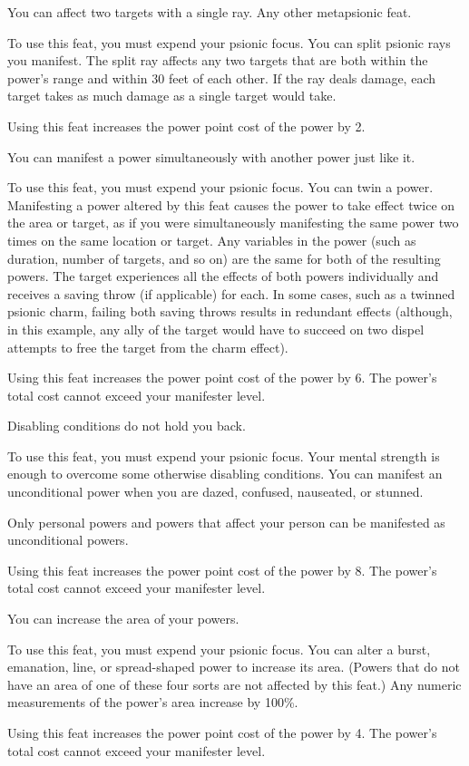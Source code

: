 {You can affect two targets with a single ray.}
{Any other metapsionic feat.}
{To use this feat, you must expend your psionic focus. You can split psionic rays you manifest. The split ray affects any two targets that are both within the power’s range and within 30 feet of each other. If the ray deals damage, each target takes as much damage as a single target would take.

Using this feat increases the power point cost of the power by 2.}{}{}

{You can manifest a power simultaneously with another power just like it.}
{}
{To use this feat, you must expend your psionic focus. You can twin a power. Manifesting a power altered by this feat causes the power to take effect twice on the area or target, as if you were simultaneously manifesting the same power two times on the same location or target. Any variables in the power (such as duration, number of targets, and so on) are the same for both of the resulting powers. The target experiences all the effects of both powers individually and receives a saving throw (if applicable) for each. In some cases, such as a twinned psionic charm, failing both saving throws results in redundant effects (although, in this example, any ally of the target would have to succeed on two dispel attempts to free the target from the charm effect).

Using this feat increases the power point cost of the power by 6. The power’s total cost cannot exceed your manifester level.}{}{}

{Disabling conditions do not hold you back.}
{}
{To use this feat, you must expend your psionic focus. Your mental strength is enough to overcome some otherwise disabling conditions. You can manifest an unconditional power when you are dazed, confused, nauseated, or stunned.

Only personal powers and powers that affect your person can be manifested as unconditional powers.

Using this feat increases the power point cost of the power by 8. The power’s total cost cannot exceed your manifester level.}{}{}

{You can increase the area of your powers.}
{}
{To use this feat, you must expend your psionic focus. You can alter a burst, emanation, line, or spread-shaped power to increase its area. (Powers that do not have an area of one of these four sorts are not affected by this feat.) Any numeric measurements of the power’s area increase by 100\%.

Using this feat increases the power point cost of the power by 4. The power’s total cost cannot exceed your manifester level.}{}{}
